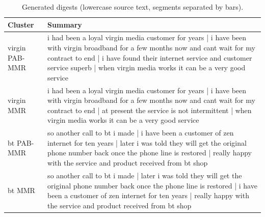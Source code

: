 \begin{table}[H]
\centering
\footnotesize
\caption{Generated digests (lowercase source text, segments separated by bars).}
\label{tab:digest}
\begin{tabular}{lp{11.5cm}}
\toprule
Cluster & Summary \\
\midrule
virgin PAB-MMR & i had been a loyal virgin media customer for years | i have been with virgin broadband for a few months now and cant wait for my contract to end | i have found their internet service and customer service superb | when virgin media works it can be a very good service \\
virgin MMR & i had been a loyal virgin media customer for years | i have been with virgin broadband for a few months now and cant wait for my contract to end | at present the service is not intermittent | when virgin media works it can be a very good service \\
bt PAB-MMR & so another call to bt i made | i have been a customer of zen internet for ten years | later i was told they will get the original phone number back once the phone line is restored | really happy with the service and product received from bt shop \\
bt MMR & so another call to bt i made | later i was told they will get the original phone number back once the phone line is restored | i have been a customer of zen internet for ten years | really happy with the service and product received from bt shop \\
\bottomrule
\end{tabular}
\end{table}